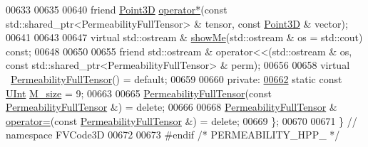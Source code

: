 \begin{DoxyCode}
00633 
00635 
00640     \textcolor{keyword}{friend} \hyperlink{classFVCode3D_1_1Point3D}{Point3D} \hyperlink{classFVCode3D_1_1PermeabilityBase_a04284b595d50559389f6098e76611b76}{operator*}(\textcolor{keyword}{const} std::shared\_ptr<PermeabilityFullTensor> & tensor, \textcolor{keyword}{const} 
      \hyperlink{classFVCode3D_1_1Point3D}{Point3D} & vector);
00641 
00643 
00647     \textcolor{keyword}{virtual} std::ostream & \hyperlink{classFVCode3D_1_1PermeabilityBase_a4f06952af19c0100b6b6043fa1f8f97a}{showMe}(std::ostream & os = std::cout) \textcolor{keyword}{const};
00648 
00650 
00655     \textcolor{keyword}{friend} std::ostream & operator<<(std::ostream & os, const std::shared\_ptr<PermeabilityFullTensor> & 
      perm);
00656 
00658     \textcolor{keyword}{virtual} ~\hyperlink{classFVCode3D_1_1PermeabilityFullTensor}{PermeabilityFullTensor}() = \textcolor{keywordflow}{default};
00659 
00660 \textcolor{keyword}{private}:
\hypertarget{Permeability_8hpp_source.tex_l00662}{}\hyperlink{classFVCode3D_1_1PermeabilityFullTensor_aeced3092b19e53f95a72bdfa6d067518}{00662}     \textcolor{keyword}{static} \textcolor{keyword}{const} \hyperlink{namespaceFVCode3D_a4bf7e328c75d0fd504050d040ebe9eda}{UInt} \hyperlink{classFVCode3D_1_1PermeabilityBase_a5914ac070cdad89b5b6f0133a0ee3ba5}{M\_size} = 9;
00663 
00665     \hyperlink{classFVCode3D_1_1PermeabilityFullTensor}{PermeabilityFullTensor}(\textcolor{keyword}{const} \hyperlink{classFVCode3D_1_1PermeabilityFullTensor}{PermeabilityFullTensor} &) = \textcolor{keyword}{
      delete};
00666 
00668     \hyperlink{classFVCode3D_1_1PermeabilityFullTensor}{PermeabilityFullTensor} & \hyperlink{classFVCode3D_1_1PermeabilityBase_abc8abcfca62e9520d74dd09dd324bd9c}{operator=}(\textcolor{keyword}{const} 
      \hyperlink{classFVCode3D_1_1PermeabilityFullTensor}{PermeabilityFullTensor} &) = \textcolor{keyword}{delete};
00669 \};
00670 
00671 \} \textcolor{comment}{// namespace FVCode3D}
00672 
00673 \textcolor{preprocessor}{#endif }\textcolor{comment}{/* PERMEABILITY\_HPP\_ */}\textcolor{preprocessor}{}
\end{DoxyCode}
